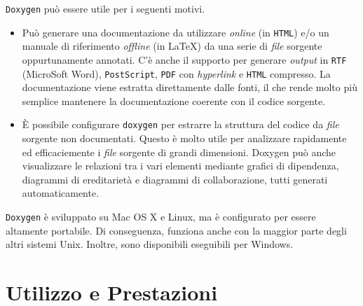 \texttt{Doxygen} può essere utile per i seguenti motivi.
\begin{itemize}
	\item Può generare una documentazione da utilizzare \textit{online} (in \texttt{HTML}) e/o un manuale di riferimento \textit{offline} (in \LaTeX) da una serie di \textit{file} sorgente oppurtunamente annotati. C'è anche il supporto per generare \textit{output} in \texttt{RTF} (MicroSoft Word), \texttt{PostScript}, \texttt{PDF} con \textit{hyperlink} e \texttt{HTML} compresso. La documentazione viene estratta direttamente dalle fonti, il che rende molto più semplice mantenere la documentazione coerente con il codice sorgente.
	\item È possibile configurare \texttt{doxygen} per estrarre la struttura del codice da \textit{file} sorgente non documentati. Questo è molto utile per analizzare rapidamente ed efficaciemente i \textit{file} sorgente di grandi dimensioni. Doxygen può anche visualizzare le relazioni tra i vari elementi mediante grafici di dipendenza, diagrammi di ereditarietà e diagrammi di collaborazione, tutti generati automaticamente.
\end{itemize}
\texttt{Doxygen} è sviluppato su Mac OS X e Linux, ma è configurato per essere altamente portabile. Di conseguenza, funziona anche con la maggior parte degli altri sistemi Unix. Inoltre, sono disponibili eseguibili per Windows.
%
\section{Utilizzo e Prestazioni}

